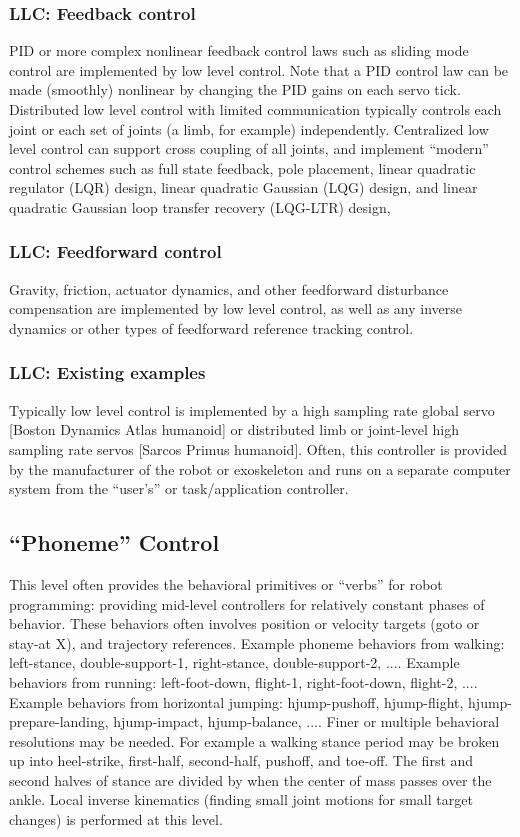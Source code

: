 \documentclass[letterpaper,12pt,fullpage]{article}
\begin{document}
\subsubsection{LLC: Feedback control}

PID or more complex nonlinear feedback control laws such as sliding mode control
are implemented by low level control. Note that a PID control law can be made
(smoothly) nonlinear by changing the PID gains on each servo tick.
Distributed low level control with limited communication typically controls each
joint or each set of joints (a limb, for example) independently.
Centralized low level control can support cross coupling of all joints,
and implement ``modern'' control schemes such as full state feedback,
pole placement, linear quadratic regulator (LQR) design, linear quadratic
Gaussian (LQG) design, and linear quadratic Gaussian loop transfer recovery
(LQG-LTR) design,

\subsubsection{LLC: Feedforward control}

Gravity, friction, actuator dynamics, and other feedforward disturbance
compensation are implemented by low level control, as well as any inverse dynamics
or other types of feedforward reference tracking control.

\subsubsection{LLC: Existing examples}

Typically low level control is implemented
by a high sampling rate global servo [Boston Dynamics Atlas humanoid]
or distributed limb or joint-level high sampling rate servos
[Sarcos Primus humanoid].
Often, this controller is provided by the manufacturer of the robot
or exoskeleton and runs on a separate computer system from the
``user's'' or task/application controller.

\subsection{``Phoneme'' Control}

This level often provides the behavioral primitives or ``verbs'' for robot programming:
providing mid-level controllers
for relatively constant phases of behavior.
These behaviors often involves position or velocity targets (goto or
stay-at X), and trajectory references.
Example phoneme behaviors from walking: left-stance, double-support-1, right-stance, double-support-2, ....
Example behaviors from running: left-foot-down, flight-1, right-foot-down, flight-2, ....
Example behaviors from horizontal jumping: hjump-pushoff, hjump-flight, hjump-prepare-landing, hjump-impact, hjump-balance, ....
Finer or multiple behavioral resolutions may be needed.
For example a walking stance period may
be broken up into heel-strike, first-half, second-half, pushoff, and toe-off.
The first and second halves of stance are divided by when the center of mass
passes over the ankle.
Local inverse kinematics (finding small joint motions for small target changes)
is performed at this level.
\end{document}
